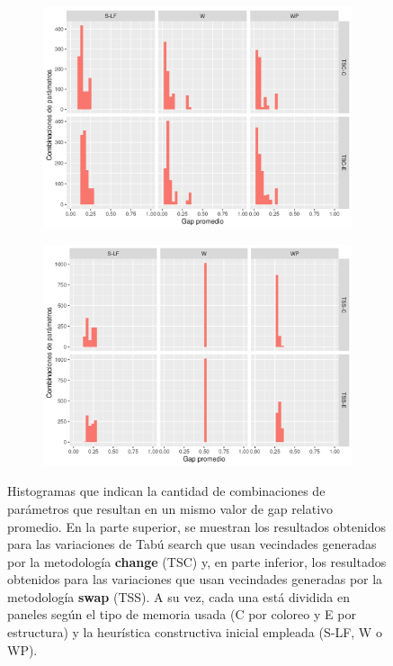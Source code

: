 \begin{figure}[H]
    \centering
\begin{subfigure}[b]{0.7\textwidth}
         \centering
         \includegraphics[width=\textwidth]{plots/histograma_tsc.png}
         \label{fig:histogramas-TSC}
\end{subfigure}
\begin{subfigure}[b]{0.7\textwidth}
         \centering
         \includegraphics[width=\textwidth]{plots/histograma_tss.png}
         \label{fig:histogramas-TSS}
\end{subfigure}
\caption{Histogramas que indican la cantidad de combinaciones de parámetros que resultan en un mismo valor de gap relativo promedio. En la parte superior, se muestran los resultados obtenidos para las variaciones de Tabú search que usan vecindades generadas por la metodología \textbf{change} (TSC) y, en parte inferior, los resultados obtenidos para las variaciones que usan vecindades generadas por la metodología \textbf{swap} (TSS). A su vez, cada una está dividida en paneles según el tipo de memoria usada (C por coloreo y E por estructura) y la heurística constructiva inicial empleada (S-LF, W o WP).}
\label{plot:histogramas}
\end{figure}

